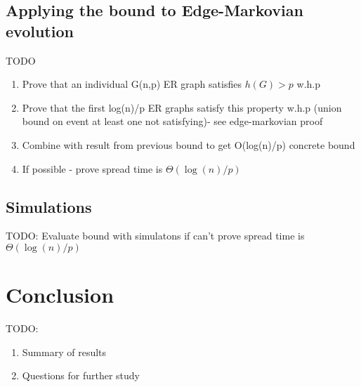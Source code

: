 \documentclass[a4paper,11pt]{article}
\theoremstyle{definition}
\begin{document}
\subsection{Applying the bound to Edge-Markovian evolution}

TODO
\begin{enumerate}
	\item Prove that an individual G(n,p) ER graph satisfies $h(G) > p$ w.h.p
	\item Prove that the first log(n)/p ER graphs satisfy this property w.h.p (union bound on event at least one not satisfying)- see edge-markovian proof
	\item Combine with result from previous bound to get O(log(n)/p) concrete bound
	\item If possible - prove spread time is $\Theta(\log(n)/p)$
\end{enumerate}

\subsection{Simulations}

TODO: Evaluate bound with simulatons if can't prove spread time is  $\Theta(\log(n)/p)$

\section{Conclusion}

TODO:

\begin{enumerate}
	\item Summary of results
	\item Questions for further study
\end{enumerate}
\end{document}
